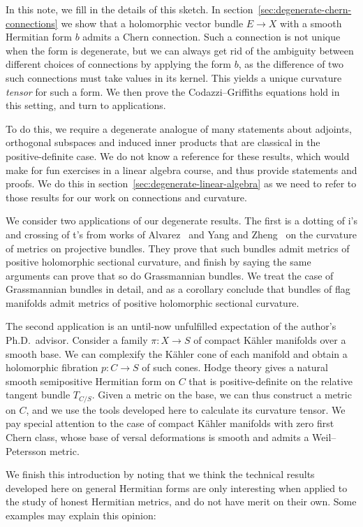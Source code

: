 \documentclass[10pt,a4paper]{article}
\begin{document}
In this note, we fill in the details of this sketch. In section~\ref{sec:degenerate-chern-connections} we show that a holomorphic vector bundle $E \to X$ with a smooth Hermitian form $b$ admits a Chern connection. Such a connection is not unique when the form is degenerate, but we can always get rid of the ambiguity between different choices of connections by applying the form $b$, as the difference of two such connections must take values in its kernel. This yields a unique curvature \emph{tensor} for such a form. We then prove the Codazzi--Griffiths equations hold in this setting, and turn to applications.

To do this, we require a degenerate analogue of many statements about adjoints, orthogonal subspaces and induced inner products that are classical in the positive-definite case. We do not know a reference for these results, which would make for fun exercises in a linear algebra course, and thus provide statements and proofs. We do this in section~\ref{sec:degenerate-linear-algebra} as we need to refer to those results for our work on connections and curvature.

We consider two applications of our degenerate results. The first is a dotting of i's and crossing of t's from works of Alvarez~\cite{alvarez2016positive} and Yang and Zheng~\cite{yang2019hirzebruch} on the curvature of metrics on projective bundles. They prove that such bundles admit metrics of positive holomorphic sectional curvature, and finish by saying the same arguments can prove that so do Grassmannian bundles. We treat the case of Grassmannian bundles in detail, and as a corollary conclude that bundles of flag manifolds admit metrics of positive holomorphic sectional curvature.

The second application is an until-now unfulfilled expectation of the author's Ph.D.~advisor. Consider a family $\pi : X \to S$ of compact K\"ahler manifolds over a smooth base. We can complexify the K\"ahler cone of each manifold and obtain a holomorphic fibration $p : C \to S$ of such cones. Hodge theory gives a natural smooth semipositive Hermitian form on $C$ that is positive-definite on the relative tangent bundle $T_{C/S}$. Given a metric on the base, we can thus construct a metric on $C$, and we use the tools developed here to calculate its curvature tensor. We pay special attention to the case of compact K\"ahler manifolds with zero first Chern class, whose base of versal deformations is smooth and admits a Weil--Petersson metric.

We finish this introduction by noting that we think the technical results developed here on general Hermitian forms are only interesting when applied to the study of honest Hermitian metrics, and do not have merit on their own. Some examples may explain this opinion:
\end{document}
